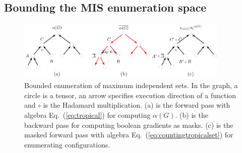 \documentclass[onefignum, onetabnum]{siamart190516}
\newcommand{\<}{\langle}
\renewcommand{\>}{\rangle}
\newcommand{\Eq}[1]{Eq.~(\ref{#1})}
\begin{document}
\subsection{Bounding the MIS enumeration space}
\begin{figure}
    \centering
    \includegraphics[width=0.9\textwidth, trim={0cm 0cm 0cm 0cm}, clip]{figures/masktree.pdf}
    \caption{Bounded enumeration of maximum independent sets. In the graph, a circle is a tensor, an arrow specifies execution direction of a function and $\circ$ is the Hadamard multiplication. (a) is the forward pass with algebra \Eq{eq:tropical} for computing $\alpha(G)$.
     (b) is the backward pass for computing boolean gradients as masks.
     (c) is the masked forward pass with algebra \Eq{eq:countingtropicalset} for enumerating configurations.}
     \label{fig:bounding}
\end{figure}
\end{document}
